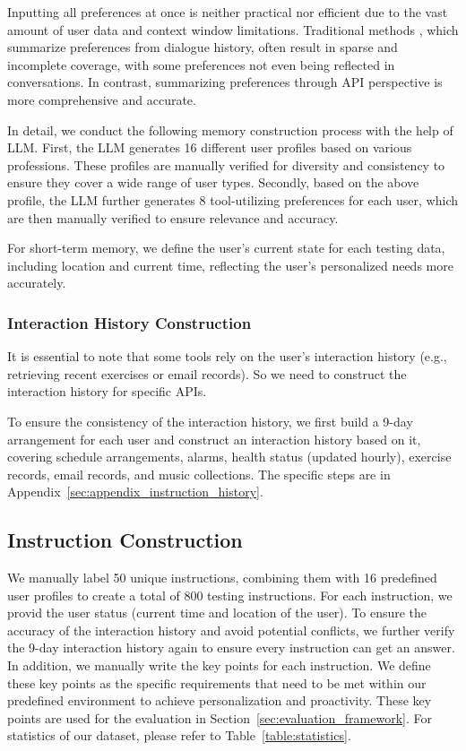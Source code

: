 \documentclass[11pt]{article}
\begin{document}
Inputting all preferences at once is neither practical nor efficient due to the vast amount of user data and context window limitations. Traditional methods \cite{zhao2025do}, which summarize preferences from dialogue history, often result in sparse and incomplete coverage, with some preferences not even being reflected in conversations. In contrast, summarizing preferences through API perspective is more comprehensive and accurate.



In detail, we conduct the following memory construction process with the help of LLM. First, the LLM generates 16 different user profiles based on various professions. These profiles are manually verified for diversity and consistency to ensure they cover a wide range of user types. Secondly, based on the above profile, the LLM further generates 8 tool-utilizing preferences for each user, which are then manually verified to ensure relevance and accuracy.


For short-term memory, we define the user's current state for each testing data, including location and current time, reflecting the user's personalized needs more accurately.


\subsubsection{Interaction History Construction}
It is essential to note that some tools rely on the user's interaction history (e.g., retrieving recent exercises or email records). So we need to construct the interaction history for specific APIs. 

To ensure the consistency of the interaction history, we first build a 9-day arrangement for each user and construct an interaction history based on it, covering schedule arrangements, alarms, health status (updated hourly), exercise records, email records, and music collections. The specific steps are in Appendix~\ref{sec:appendix_instruction_history}. 








\subsection{Instruction Construction}
\label{sec:instruction_construction}
We manually label 50 unique instructions, combining them with 16 predefined user profiles to create a total of 800 testing instructions. For each instruction, we provid the user status (current time and location of the user). To ensure the accuracy of the interaction history and avoid potential conflicts, we further verify the 9-day interaction history again to ensure every instruction can get an answer. In addition, we manually write the key points for each instruction. We define these key points as the specific requirements that need to be met within our predefined environment to achieve personalization and proactivity. These key points are used for the evaluation in Section~\ref{sec:evaluation_framework}. For statistics of our dataset, please refer to Table~\ref{table:statistics}.
\end{document}
